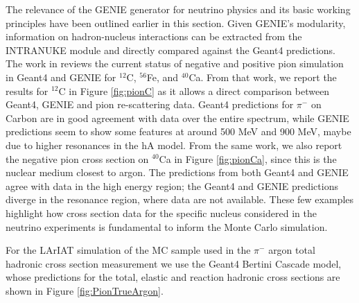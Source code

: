 The relevance of the GENIE generator for neutrino physics and its basic working principles have been outlined earlier in this section. Given GENIE's modularity, information on hadron-nucleus interactions can be extracted from the  INTRANUKE module and directly compared against the Geant4 predictions.
The work in \cite{Nutini2015}  reviews  the current status of negative and positive pion simulation in Geant4 and GENIE for $^{12}$C, $^{56}$Fe, and $^{40}$Ca. From that work, we report the results for $^{12}$C in Figure \ref{fig:pionC} as it allows a direct comparison between Geant4, GENIE and pion re-scattering data.  Geant4 predictions for $\pi^-$  on Carbon are in good agreement with data over  the entire  spectrum, while GENIE predictions seem to show some features at around 500 MeV and 900 MeV, maybe due to higher resonances in the hA model. From the same work, we also report the negative pion cross section on $^{40}$Ca in Figure \ref{fig:pionCa}, since this is the nuclear medium closest to argon. The predictions from both Geant4 and GENIE agree with data in the high energy region; the Geant4 and GENIE predictions diverge in the resonance region, where data are not available. These few examples highlight how cross section data for the specific nucleus considered in the neutrino experiments is fundamental to inform the Monte Carlo simulation.

For the LArIAT simulation of the MC sample used in the $\pi^-$ argon total hadronic cross section measurement we use the Geant4 Bertini Cascade model, whose  predictions for the total, elastic and reaction hadronic cross sections are shown in Figure \ref{fig:PionTrueArgon}.




